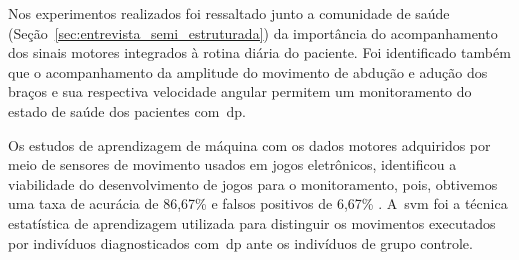 



Nos experimentos realizados foi ressaltado junto a comunidade de saúde (Seção~\ref{sec:entrevista_semi_estruturada}) da importância do acompanhamento dos sinais motores integrados à rotina diária do paciente. Foi identificado também que o acompanhamento da amplitude do movimento de abdução e adução dos braços e sua respectiva velocidade angular permitem um monitoramento do estado de saúde dos pacientes com~\ac{dp}.

Os estudos de aprendizagem de máquina com os dados motores adquiridos por meio de sensores de movimento usados em jogos eletrônicos, identificou a viabilidade do desenvolvimento de jogos para o monitoramento, pois, obtivemos uma taxa de acurácia de 86,67\% e falsos positivos de 6,67\% . A~\ac{svm} foi a técnica estatística de aprendizagem utilizada para distinguir os movimentos executados por indivíduos diagnosticados com~\ac{dp} ante os indivíduos de grupo controle. 


